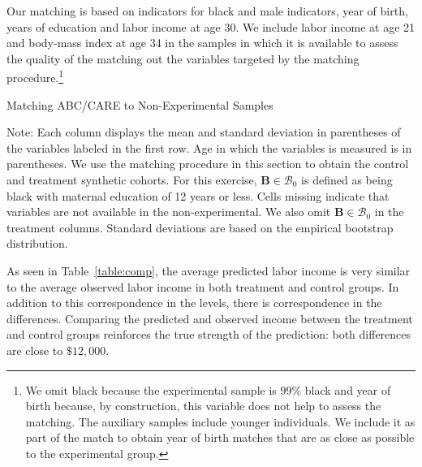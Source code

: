 Our matching is based on indicators for black and male indicators, year of birth, years of education and labor income at age 30. We include labor income at age 21 and body-mass index at age 34 in the samples in which it is available to assess the quality of the matching out the variables targeted by the matching procedure.\footnote{We omit black because the experimental sample is $99\%$ black and year of birth because, by construction, this variable does not help to assess the matching. The auxiliary samples include younger individuals. We include it as part of the match to obtain year of birth matches that are as close as possible to the experimental group.}

\begin{table} 
\begin{threeparttable}
\caption{Matching ABC/CARE to Non-Experimental Samples}
\label{table:comp}
\centering
\footnotesize 

\begin{tablenotes}
\footnotesize
\item Note: Each column displays the mean and standard deviation in parentheses of the variables labeled in the first row. Age in which the variables is measured is in parentheses. We use the matching procedure in this section to obtain the control and treatment synthetic cohorts. For this exercise, $\bm{B} \in \mathcal{B}_0$ is defined as being black with maternal education of 12 years or less. Cells missing indicate that variables are not available in the non-experimental. We also omit $\bm{B} \in \mathcal{B}_0$ in the treatment columns. Standard deviations are based on the empirical bootstrap distribution.
\end{tablenotes}
\end{threeparttable}
\end{table}
\restoregeometry
\doublespacing

As seen in Table~\ref{table:comp}, the average predicted labor income is very similar to the average observed labor income in both treatment and control groups. In addition to this correspondence in the levels, there is correspondence in the differences. Comparing the predicted and observed income between the treatment and control groups reinforces the true strength of the prediction: both differences are close to $\$12,000$.

